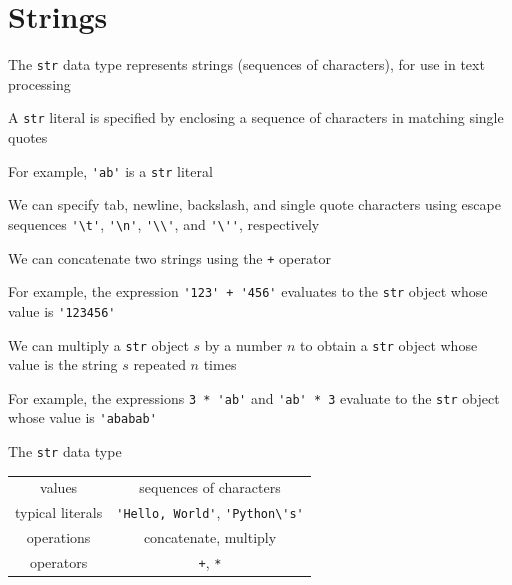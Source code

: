\documentclass[8pt,a4paper,compress]{beamer}
\begin{document}
\section{Strings}
\begin{frame}[fragile]
\pause

The \lstinline{str} data type represents strings (sequences of characters), for use in text processing

\pause\bigskip

A \lstinline{str} literal is specified by enclosing a sequence of characters in matching single quotes

\pause\bigskip

For example, \lstinline{'ab'} is a \lstinline{str} literal

\pause\bigskip

We can specify tab, newline, backslash, and single quote characters using escape sequences \lstinline{'\t'}, \lstinline{'\n'}, \lstinline{'\\'}, and \lstinline{'\''}, respectively

\pause\bigskip

We can concatenate two strings using the \lstinline{+} operator

\pause\bigskip

For example, the expression \lstinline{'123' + '456'} evaluates to the \lstinline{str} object whose value is \lstinline{'123456'}

\pause\bigskip

We can multiply a \lstinline{str} object $s$ by a number $n$ to obtain a \lstinline{str} object whose value is the string $s$ repeated $n$ times

\pause\bigskip

For example, the expressions \lstinline{3 * 'ab'} and \lstinline{'ab' * 3} evaluate to the \lstinline{str} object whose value is \lstinline{'ababab'}

\pause\bigskip

The \lstinline{str} data type

\begin{center}
\begin{tabular}{c|c}
values & sequences of characters \\ 
typical literals & \lstinline$'Hello, World'$, \lstinline$'Python\'s'$ \\ 
operations & concatenate, multiply \\
operators & \lstinline$+$, \lstinline$*$
\end{tabular} 
\end{center}
\end{frame}
\end{document}
